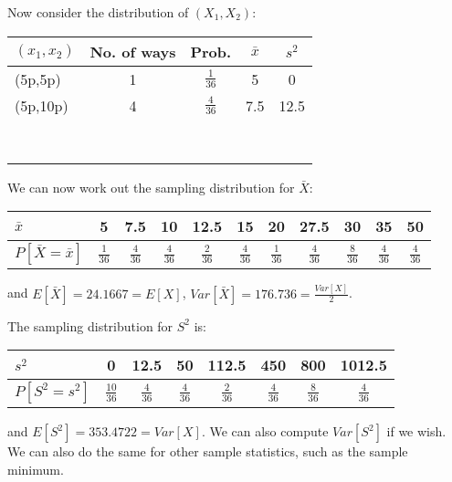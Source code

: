 \documentclass[12pt]{article}
\begin{document}
Now consider the distribution of $(X_{1},X_{2})$:
\begin{center}
\begin{tabular}{|l|c|c|c|c|}
  \hline
  $(x_{1},x_{2})$ & No. of ways & Prob. & $\bar{x}$ & $s^{2}$ \\ \hline
  (5p,5p) & 1 & $\frac{1}{36}$ & 5 & 0 \\[8pt] \hline
  (5p,10p)& 4 & $\frac{4}{36}$ & 7.5 & 12.5 \\[8pt] \hline
   &  &  &  &  \\[8pt] \hline
   &  &  &  & \\[8pt] \hline
   &  &  &  &  \\[8pt] \hline
   &  &  &  &  \\[8pt] \hline
   &  &  &  &  \\[8pt]\hline
   &  &  &  &  \\[8pt]\hline
   &  &  &  &  \\[8pt]\hline
   &  &  &  &  \\[8pt]
  \hline
\end{tabular}
\end{center}
We can now work out the sampling distribution for $\bar{X}$:
\begin{center}
\begin{tabular}{|l|c|c|c|c|c|c|c|c|c|c|}
  \hline
  $\bar{x}$ & 5 & 7.5 & 10 & 12.5 & 15 & 20 & 27.5 & 30 & 35 & 50 \\ \hline
  $P[\bar{X}=\bar{x}]$ & $\frac{1}{36}$ & $\frac{4}{36}$ & $\frac{4}{36}$ & $\frac{2}{36}$ & $\frac{4}{36}$ & $\frac{1}{36}$ & $\frac{4}{36}$ & $\frac{8}{36}$ & $\frac{4}{36}$ & $\frac{4}{36}$ \\
  \hline
\end{tabular}
\end{center}
and $E[\bar{X}]=24.1667=E[X]$, $ \displaystyle Var[\bar{X}]=176.736=\frac{Var[X]}{2}$.

The sampling distribution for $S^{2}$ is:
\begin{center}
\begin{tabular}{|l|c|c|c|c|c|c|c|}
  \hline
  $s^{2}$ & 0 & 12.5 & 50 & 112.5 & 450 & 800 & 1012.5 \\ \hline
  $P[S^{2}=s^{2}]$ & $\frac{10}{36}$ & $\frac{4}{36}$ & $\frac{4}{36}$ & $\frac{2}{36}$ & $\frac{4}{36}$ & $\frac{8}{36}$ & $\frac{4}{36}$ \\
  \hline
\end{tabular}
\end{center}
and $E[S^{2}]=353.4722=Var[X]$. We can also compute $Var[S^2]$ if we wish. We can also do the same for other sample statistics, such as the sample minimum.
\end{document}

